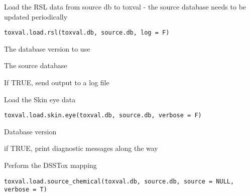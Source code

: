 \documentclass[letterpaper]{book}
\begin{document}
%
\begin{Description}\relax
Load the RSL data from source db to toxval - the source database needs to be updated periodically
\end{Description}
%
\begin{Usage}
\begin{verbatim}
toxval.load.rsl(toxval.db, source.db, log = F)
\end{verbatim}
\end{Usage}
%
\begin{Arguments}
\begin{ldescription}
\item[\code{toxval.db}] The database version to use

\item[\code{source.db}] The source database

\item[\code{log}] If TRUE, send output to a log file
\end{ldescription}
\end{Arguments}
%
\begin{Description}\relax
Load the Skin eye data
\end{Description}
%
\begin{Usage}
\begin{verbatim}
toxval.load.skin.eye(toxval.db, source.db, verbose = F)
\end{verbatim}
\end{Usage}
%
\begin{Arguments}
\begin{ldescription}
\item[\code{toxval.db}] Database version

\item[\code{verbose}] if TRUE, print diagnostic messages along the way
\end{ldescription}
\end{Arguments}
%
\begin{Description}\relax
Perform the DSSTox mapping
\end{Description}
%
\begin{Usage}
\begin{verbatim}
toxval.load.source_chemical(toxval.db, source.db, source = NULL, verbose = T)
\end{verbatim}
\end{Usage}
\end{document}
